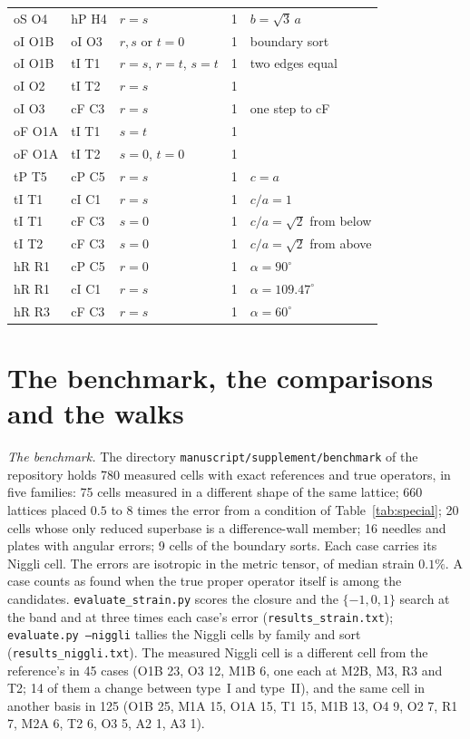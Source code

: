 \documentclass[preprint,pdf]{iucr}          %
\begin{document}
\begin{table}
\begin{footnotesize}
\begin{tabular}{llllp{4.6cm}}
oS O4 & hP H4 & $r=s$ & 1 & $b=\sqrt3\,a$ \\
oI O1B & oI O3 & $r,s$ or $t=0$ & 1 & boundary sort \\
oI O1B & tI T1 & $r=s$, $r=t$, $s=t$ & 1 & two edges equal \\
oI O2 & tI T2 & $r=s$ & 1 & \\
oI O3 & cF C3 & $r=s$ & 1 & one step to cF \\
oF O1A & tI T1 & $s=t$ & 1 & \\
oF O1A & tI T2 & $s=0$, $t=0$ & 1 & \\
tP T5 & cP C5 & $r=s$ & 1 & $c=a$ \\
tI T1 & cI C1 & $r=s$ & 1 & $c/a=1$ \\
tI T1 & cF C3 & $s=0$ & 1 & $c/a=\sqrt2$ from below \\
tI T2 & cF C3 & $s=0$ & 1 & $c/a=\sqrt2$ from above \\
hR R1 & cP C5 & $r=0$ & 1 & $\alpha=90^\circ$ \\
hR R1 & cI C1 & $r=s$ & 1 & $\alpha=109.47^\circ$ \\
hR R3 & cF C3 & $r=s$ & 1 & $\alpha=60^\circ$ \\
\bottomrule
\end{tabular}
\end{footnotesize}
\end{table}

\section{The benchmark, the comparisons and the walks}\label{si:bench}

\emph{The benchmark.} The directory \texttt{manuscript/\allowbreak supplement/\allowbreak benchmark} of the repository holds 780 measured cells with exact references and true operators, in five families: 75 cells measured in a different shape of the same lattice; 660 lattices placed $0.5$ to $8$ times the error from a condition of Table~\ref{tab:special}; 20 cells whose only reduced superbase is a difference-wall member; 16 needles and plates with angular errors; 9 cells of the boundary sorts. Each case carries its Niggli cell. The errors are isotropic in the metric tensor, of median strain $0.1\%$. A case counts as found when the true proper operator itself is among the candidates. \texttt{evaluate\_strain.py} scores the closure and the $\{-1,0,1\}$ search at the band and at three times each case's error (\texttt{results\_strain.txt}); \texttt{evaluate.py --niggli} tallies the Niggli cells by family and sort (\texttt{results\_niggli.txt}). The measured Niggli cell is a different cell from the reference's in 45 cases (O1B 23, O3 12, M1B 6, one each at M2B, M3, R3 and T2; 14 of them a change between type~I and type~II), and the same cell in another basis in 125 (O1B 25, M1A 15, O1A 15, T1 15, M1B 13, O4 9, O2 7, R1 7, M2A 6, T2 6, O3 5, A2 1, A3 1).
\end{document}
